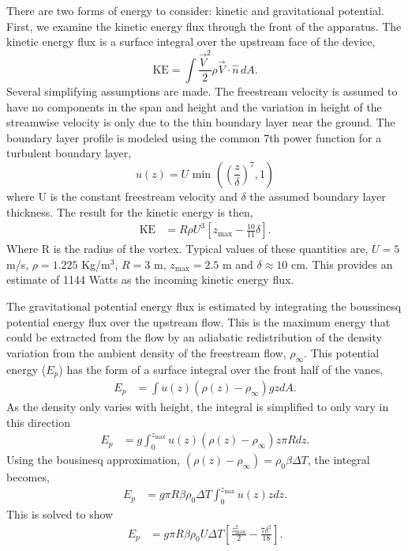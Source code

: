 There are two forms of energy to consider: kinetic and gravitational
potential. First, we examine the kinetic energy flux through the front
of the apparatus. 
The kinetic energy flux is a surface integral over the upstream face of
the device,  
\begin{equation*}
\text{KE} = \int \frac{\vec V^2}{2} \rho \vec V \cdot \hat n \, dA.
\end{equation*}
%
%
Several simplifying assumptions are made. The freestream 
velocity is assumed to have no components in the span and height and
the variation in height of the streamwise
velocity is only due to the thin boundary layer near the
ground. The boundary layer profile is modeled using the common 7th
power function for a turbulent boundary layer,  
\begin{equation*}
  u(z) = U \text{ min }\left(\left(\frac{z}{\delta}\right)^7,1\right)
\end{equation*}
where U is the constant freestream velocity and $\delta$ the assumed
boundary layer thickness. 
The result for the kinetic energy is then, 
\begin{align*}
\text{KE} & = R \rho U^3 \left[ z_{\text{max}} - \frac{10}{11}\delta
\right].
\end{align*}
Where R is the radius of the vortex. Typical values of these quantities
are, $U = 5$ m/s, $\rho = 1.225$ Kg/$\text{m}^3$, $R = 3$ m,
$z_{\text{max}} = 2.5$ m and $\delta \approx 10$ cm. This provides an
estimate of 1144 Watts as the incoming kinetic energy flux. 

The gravitational potential energy flux is estimated by integrating the
boussinesq potential energy flux over the upstream flow. 
This is the maximum energy that could be extracted from the flow by an 
adiabatic redistribution of the density variation from the ambient 
density of the freestream flow, $\rho_\infty$. 
This potential energy ($E_p$) has the form of a surface integral over 
the front half of the vanes, 
\begin{align*}
  E_p & = \int u(z) (\rho(z)-\rho_\infty) g z dA. 
\end{align*}
As the density only varies with height, the integral is simplified to only vary in 
this direction
\begin{align*}
  E_p  & = g \int^{z_\text{max}}_0 u(z) (\rho(z)-\rho_\infty) z  \pi R dz.
\end{align*}
Using the bousinesq approximation, $(\rho(z)-\rho_\infty)  = \rho_0 \beta \Delta T$,
the integral becomes, 
\begin{align*}
  E_p & = g  \pi R \beta \rho_0 \Delta T \int^{z_\text{max}}_0 u(z) z dz.
\end{align*}
This is solved to show
\begin{align*}
  E_p & = g  \pi R \beta \rho_0 U \Delta T \left[ \frac{z_\text{max}^2}{2} - \frac{7 \delta^2}{18} \right].
\end{align*}

